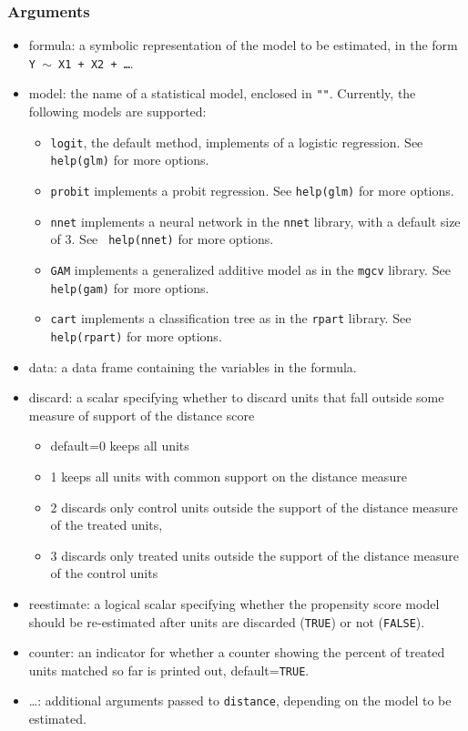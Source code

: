 \documentclass[oneside,letterpaper,titlepage]{article}
\begin{document}
\begin{appendix}
\subsubsection{Arguments}
\begin{itemize}
\item{formula}: a symbolic representation of the model to be estimated,
  in the form {\tt Y $\sim$ X1 + X2 + \dots}.
\item{model}: the name of a statistical model, enclosed in {\tt ""}.
  Currently, the following models are supported:
  \begin{itemize}
  \item \texttt{logit}, the default method, implements of a logistic regression.  See
    {\tt help(glm)} for more options. 
  \item \texttt{probit} implements a probit regression.  See
    {\tt help(glm)} for more options. 
  \item \texttt{nnet} implements a neural network in the
    \texttt{nnet} library, with a default size of 3.  See {\tt
      help(nnet)} for more options.
  \item \texttt{GAM} implements a generalized additive model 
    as in the \texttt{mgcv} library.  See
    {\tt help(gam)} for more options.
  \item \texttt{cart} implements a classification tree as in the
    \texttt{rpart} library.  See {\tt help(rpart)} for more
    options.  
  \end{itemize}
\item{data}: a data frame containing the variables in the formula.
\item{discard}: a scalar specifying whether to discard units that
  fall outside some measure of support of the distance score
  \begin{itemize}
  \item default=0 keeps all units
  \item  1 keeps all units with common support on the distance
    measure
  \item 2 discards only control units outside the support of the
    distance measure of the treated units,
  \item 3 discards only treated units outside the support of 
    the distance measure of the control units
  \end{itemize}
\item{reestimate}: a logical scalar specifying whether the
  propensity score model should be re-estimated after units are
  discarded (\texttt{TRUE}) or not (\texttt{FALSE}).
\item{counter}: an indicator for whether a counter showing the percent of treated units matched so far is printed out, default={\tt TRUE}.
\item{\dots}: additional arguments passed to \texttt{distance}, depending on
    the model to be estimated.
\end{itemize}


\end{appendix}
\end{document}
